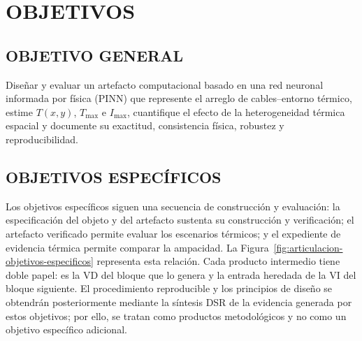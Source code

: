 \documentclass[11pt,a4paper,oneside]{report}
\newcommand{\Tmax}{T_{\max}}
\newcommand{\Imax}{I_{\max}}
\begin{document}
\section{OBJETIVOS}

\subsection{OBJETIVO GENERAL}

Diseñar y evaluar un artefacto computacional basado en una red neuronal informada por física (PINN) que represente el arreglo de cables--entorno térmico, estime $T(x,y)$, $\Tmax$ e $\Imax$, cuantifique el efecto de la heterogeneidad térmica espacial y documente su exactitud, consistencia física, robustez y reproducibilidad.

\subsection{OBJETIVOS ESPECÍFICOS}

Los objetivos específicos siguen una secuencia de construcción y evaluación: la especificación del objeto y del artefacto sustenta su construcción y verificación; el artefacto verificado permite evaluar los escenarios térmicos; y el expediente de evidencia térmica permite comparar la ampacidad. La Figura~\ref{fig:articulacion-objetivos-especificos} representa esta relación. Cada producto intermedio tiene doble papel: es la VD del bloque que lo genera y la entrada heredada de la VI del bloque siguiente. El procedimiento reproducible y los principios de diseño se obtendrán posteriormente mediante la síntesis DSR de la evidencia generada por estos objetivos; por ello, se tratan como productos metodológicos y no como un objetivo específico adicional.
\end{document}
